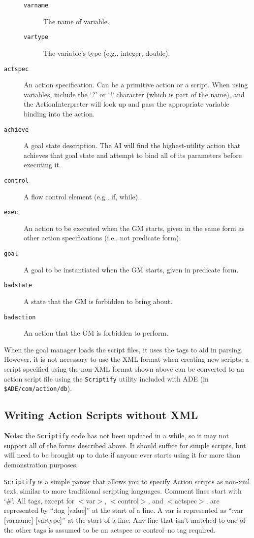 \documentclass[11pt,letterpaper]{article}
\begin{document}
\begin{description}
\begin{description}
\item[\tt varname] The name of variable.
\item[\tt vartype] The variable's type (e.g., integer, double).
\end{description}
\item[\tt actspec] An action specification.  Can be a primitive action  
or a script.  When using variables, include the `?' or `!' character 
(which is part of the name), and the ActionInterpreter will look up 
and pass the appropriate variable binding into the action.
\item[\tt achieve] A goal state description.  The AI will find the
  highest-utility action that achieves that goal state and attempt to
  bind all of its parameters before executing it.
\item[\tt control] A flow control element (e.g., if, while).
\item[\tt exec] An action to be executed when the GM starts, given in
  the same form as other action specifications (i.e., not predicate
  form).
\item[\tt goal] A goal to be instantiated when the GM starts, given in
  predicate form.
\item[\tt badstate] A state that the GM is forbidden to bring about.
\item[\tt badaction] An action that the GM is forbidden to perform.

\end{description}

\noindent When the goal manager loads the script files, it uses the 
tags to aid in parsing.  However, it is not necessary to use the XML 
format when creating new scripts; a script specified using the non-XML 
format shown above can be converted to an action script file using the 
{\tt Scriptify} utility included with ADE (in {\tt 
\$ADE/com/action/db}).  

\subsection{Writing Action Scripts without XML}

{\bf Note:} the {\tt Scriptify} code has not been updated in a while,
so it may not support all of the forms described above.  It should
suffice for simple scripts, but will need to be brought up to date if
anyone ever starts using it for more than demonstration purposes.

{\tt Scriptify} is a simple parser that allows you to specify Action
scripts as non-xml text, similar to more traditional scripting
languages.  Comment lines start with `\#'.  All tags, except for
$<$var$>$, $<$control$>$, and $<$actspec$>$, are represented by ``:tag
[value]'' at the start of a line.  A var is represented as ``:var
[varname] [vartype]'' at the start of a line.  Any line that isn't
matched to one of the other tags is assumed to be an actspec or
control--no tag required.
\end{document}
